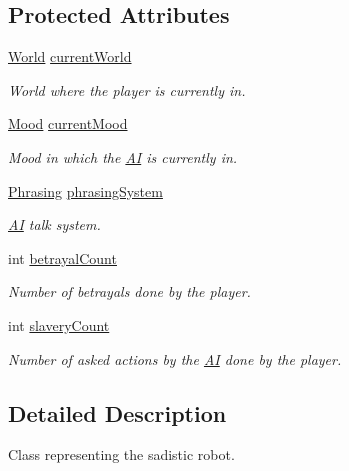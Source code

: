 \subsection*{Protected Attributes}
\begin{DoxyCompactItemize}
\item 
\hyperlink{classworld_1_1_world}{World} \hyperlink{classgameplay_1_1ai_1_1_a_i_ae4344290e04c468cdd631fc367f4f885}{current\-World}
\begin{DoxyCompactList}\small\item\em World where the player is currently in. \end{DoxyCompactList}\item 
\hyperlink{classgameplay_1_1ai_1_1mood_1_1_mood}{Mood} \hyperlink{classgameplay_1_1ai_1_1_a_i_aad698027b11d4b58a4da8c2952484ccb}{current\-Mood}
\begin{DoxyCompactList}\small\item\em Mood in which the \hyperlink{classgameplay_1_1ai_1_1_a_i}{A\-I} is currently in. \end{DoxyCompactList}\item 
\hyperlink{classgameplay_1_1ai_1_1phrasing_1_1_phrasing}{Phrasing} \hyperlink{classgameplay_1_1ai_1_1_a_i_ae868fc7b0dc6cab4bebd1d97712a6e7e}{phrasing\-System}
\begin{DoxyCompactList}\small\item\em \hyperlink{classgameplay_1_1ai_1_1_a_i}{A\-I} talk system. \end{DoxyCompactList}\item 
int \hyperlink{classgameplay_1_1ai_1_1_a_i_a3e328844c8791e3034bcf2fa5cc00f28}{betrayal\-Count}
\begin{DoxyCompactList}\small\item\em Number of betrayals done by the player. \end{DoxyCompactList}\item 
int \hyperlink{classgameplay_1_1ai_1_1_a_i_a891607c5493095d3c5e7988b401b769c}{slavery\-Count}
\begin{DoxyCompactList}\small\item\em Number of asked actions by the \hyperlink{classgameplay_1_1ai_1_1_a_i}{A\-I} done by the player. \end{DoxyCompactList}\end{DoxyCompactItemize}


\subsection{Detailed Description}
Class representing the sadistic robot. 

